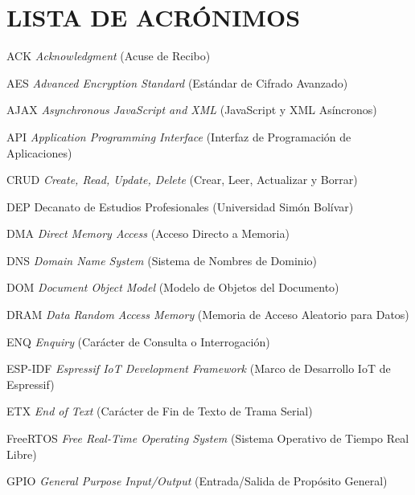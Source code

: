 \chapter*{LISTA DE ACRÓNIMOS}

\newenvironment{acrolist}[1]{%
  \begin{list}{}{%
    \settowidth{\labelwidth}{\textbf{#1}}%
    \setlength{\leftmargin}{\labelwidth}%
    \addtolength{\leftmargin}{\labelsep}%
    \setlength{\itemsep}{0pt}%
    \setlength{\parsep}{0pt}%
    \setlength{\topsep}{2pt}%
    \setlength{\partopsep}{0pt}%
    \renewcommand{\makelabel}[1]{\makebox[\labelwidth][l]{\textbf{##1}}}%
  }%
}{\end{list}}

\begin{acrolist}{FreeRTOS}
\item[ACK] \textit{Acknowledgment} (Acuse de Recibo)
\item[AES] \textit{Advanced Encryption Standard} (Estándar de Cifrado Avanzado)
\item[AJAX] \textit{Asynchronous JavaScript and XML} (JavaScript y XML Asíncronos)
\item[API] \textit{Application Programming Interface} (Interfaz de Programación de Aplicaciones)
\item[CRUD] \textit{Create, Read, Update, Delete} (Crear, Leer, Actualizar y Borrar)
\item[DEP] Decanato de Estudios Profesionales (Universidad Simón Bolívar)
\item[DMA] \textit{Direct Memory Access} (Acceso Directo a Memoria)
\item[DNS] \textit{Domain Name System} (Sistema de Nombres de Dominio)
\item[DOM] \textit{Document Object Model} (Modelo de Objetos del Documento)
\item[DRAM] \textit{Data Random Access Memory} (Memoria de Acceso Aleatorio para Datos)
\item[ENQ] \textit{Enquiry} (Carácter de Consulta o Interrogación)
\item[ESP-IDF] \textit{Espressif IoT Development Framework} (Marco de Desarrollo IoT de Espressif)
\item[ETX] \textit{End of Text} (Carácter de Fin de Texto de Trama Serial)
\item[FreeRTOS] \textit{Free Real-Time Operating System} (Sistema Operativo de Tiempo Real Libre)
\item[GPIO] \textit{General Purpose Input/Output} (Entrada/Salida de Propósito General)

\end{acrolist}
